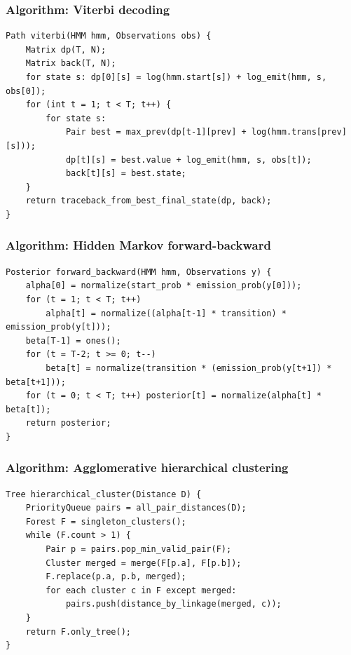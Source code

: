\documentclass[11pt]{article}
\begin{document}
\subsubsection{Algorithm: Viterbi decoding}\label{algorithm-viterbi-decoding}

\begin{verbatim}
Path viterbi(HMM hmm, Observations obs) {
    Matrix dp(T, N);
    Matrix back(T, N);
    for state s: dp[0][s] = log(hmm.start[s]) + log_emit(hmm, s, obs[0]);
    for (int t = 1; t < T; t++) {
        for state s:
            Pair best = max_prev(dp[t-1][prev] + log(hmm.trans[prev][s]));
            dp[t][s] = best.value + log_emit(hmm, s, obs[t]);
            back[t][s] = best.state;
    }
    return traceback_from_best_final_state(dp, back);
}
\end{verbatim}

\subsubsection{Algorithm: Hidden Markov forward-backward}\label{algorithm-hidden-markov-forward-backward}

\begin{verbatim}
Posterior forward_backward(HMM hmm, Observations y) {
    alpha[0] = normalize(start_prob * emission_prob(y[0]));
    for (t = 1; t < T; t++)
        alpha[t] = normalize((alpha[t-1] * transition) * emission_prob(y[t]));
    beta[T-1] = ones();
    for (t = T-2; t >= 0; t--)
        beta[t] = normalize(transition * (emission_prob(y[t+1]) * beta[t+1]));
    for (t = 0; t < T; t++) posterior[t] = normalize(alpha[t] * beta[t]);
    return posterior;
}
\end{verbatim}

\subsubsection{Algorithm: Agglomerative hierarchical clustering}\label{algorithm-agglomerative-hierarchical-clustering}

\begin{verbatim}
Tree hierarchical_cluster(Distance D) {
    PriorityQueue pairs = all_pair_distances(D);
    Forest F = singleton_clusters();
    while (F.count > 1) {
        Pair p = pairs.pop_min_valid_pair(F);
        Cluster merged = merge(F[p.a], F[p.b]);
        F.replace(p.a, p.b, merged);
        for each cluster c in F except merged:
            pairs.push(distance_by_linkage(merged, c));
    }
    return F.only_tree();
}
\end{verbatim}
\end{document}

